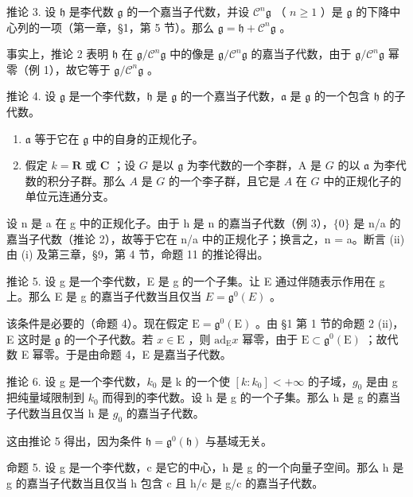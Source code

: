 推论 3. 设 \(\mathfrak{h}\) 是李代数 \(\mathfrak{g}\) 的一个嘉当子代数，并设 \(\mathcal{C}^n\mathfrak{g}\) （ \(n \geq 1\) ）是 \(\mathfrak{g}\) 的下降中心列的一项（第一章，§1，第 5 节）。那么 \(\mathfrak{g} = \mathfrak{h} + \mathcal{C}^n\mathfrak{g}\) 。

事实上，推论 2 表明 \(\mathfrak{h}\) 在 \(\mathfrak{g} / \mathcal{C}^n\mathfrak{g}\) 中的像是 \(\mathfrak{g} / \mathcal{C}^n\mathfrak{g}\) 的嘉当子代数，由于 \(\mathfrak{g} / \mathcal{C}^n\mathfrak{g}\) 幂零（例 1），故它等于 \(\mathfrak{g} / \mathcal{C}^n\mathfrak{g}\) 。

推论 4. 设 \(\mathfrak{g}\) 是一个李代数，\(\mathfrak{h}\) 是 \(\mathfrak{g}\) 的一个嘉当子代数，\(\mathfrak{a}\) 是 \(\mathfrak{g}\) 的一个包含 \(\mathfrak{h}\) 的子代数。

\begin{enumerate}
\def\labelenumi{(\roman{enumi})}
\item
  \(\mathfrak{a}\) 等于它在 \(\mathfrak{g}\) 中的自身的正规化子。
\item
  假定 \(k = \mathbf{R}\) 或 \(\mathbf{C}\) ；设 \(G\) 是以 \(\mathfrak{g}\) 为李代数的一个李群，A 是 \(G\) 的以 \(\mathfrak{a}\) 为李代数的积分子群。那么 \(A\) 是 \(G\) 的一个李子群，且它是 \(A\) 在 \(G\) 中的正规化子的单位元连通分支。
\end{enumerate}

设 n 是 a 在 g 中的正规化子。由于 h 是 n 的嘉当子代数（例 3），\(\{0\}\) 是 n/a 的嘉当子代数（推论 2），故等于它在 n/a 中的正规化子；换言之，n = a。断言 (ii) 由 (i) 及第三章，§9，第 4 节，命题 11 的推论得出。

推论 5. 设 g 是一个李代数，E 是 g 的一个子集。让 E 通过伴随表示作用在 g 上。那么 E 是 g 的嘉当子代数当且仅当 \(E = \mathfrak{g}^{0}(E)\) 。

该条件是必要的（命题 4）。现在假定 \(\mathrm{E} = \mathfrak{g}^0 (\mathrm{E})\) 。由 §1 第 1 节的命题 2 (ii)，E 这时是 \(\mathfrak{g}\) 的一个子代数。若 \(x\in \mathrm{E}\) ，则 \(\mathrm{ad}_{\mathrm{E}}x\) 幂零，由于 \(\mathrm{E}\subset \mathfrak{g}^0 (\mathrm{E})\) ；故代数 E 幂零。于是由命题 4，E 是嘉当子代数。

推论 6. 设 g 是一个李代数，\(k_{0}\) 是 k 的一个使 \([k:k_{0}]<+\infty\) 的子域，\(g_{0}\) 是由 g 把纯量域限制到 \(k_{0}\) 而得到的李代数。设 h 是 g 的一个子集。那么 h 是 g 的嘉当子代数当且仅当 h 是 \(g_{0}\) 的嘉当子代数。

这由推论 5 得出，因为条件 \(\mathfrak{h} = \mathfrak{g}^0 (\mathfrak{h})\) 与基域无关。

命题 5. 设 g 是一个李代数，c 是它的中心，h 是 g 的一个向量子空间。那么 h 是 g 的嘉当子代数当且仅当 h 包含 c 且 h/c 是 g/c 的嘉当子代数。

